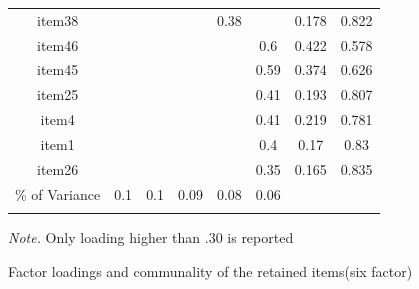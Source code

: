 \documentclass[
  english,
  man]{apa6}
\begin{document}
\begin{appendix}
\begin{table}[tbp]
\begin{center}
\begin{threeparttable}
{\begin{tabular}{cccccccc}
item38 &  &  &  & 0.38 &  & 0.178 & 0.822\\
item46 &  &  &  &  & 0.6 & 0.422 & 0.578\\
item45 &  &  &  &  & 0.59 & 0.374 & 0.626\\
item25 &  &  &  &  & 0.41 & 0.193 & 0.807\\
item4 &  &  &  &  & 0.41 & 0.219 & 0.781\\
item1 &  &  &  &  & 0.4 & 0.17 & 0.83\\
item26 &  &  &  &  & 0.35 & 0.165 & 0.835\\
\% of Variance & 0.1 & 0.1 & 0.09 & 0.08 & 0.06 &  & \\
\bottomrule
\addlinespace
\end{tabular}

}

\begin{tablenotes}[para]
\normalsize{\textit{Note.} Only loading higher than .30 is reported}
\end{tablenotes}

\end{threeparttable}
\end{center}

\end{table}

\begin{table}[tbp]

\begin{center}
\begin{threeparttable}

\caption{\label{tab:sixFacTab}Factor loadings and communality of the retained items(six factor)}

\small{

}
\end{threeparttable}
\end{center}
\end{table}
\end{appendix}
\end{document}
